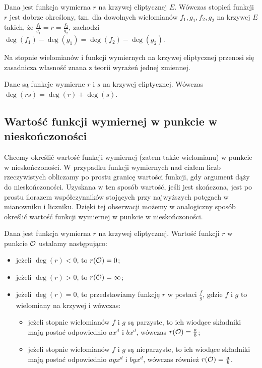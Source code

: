 \begin{theorem}
Dana jest funkcja wymierna $r$ na krzywej eliptycznej $E$.
Wówczas stopień funkcji $r$ jest dobrze określony,
tzn. dla dowolnych wielomianów $f_1, g_1, f_2, g_2$ na krzywej $E$ takich,
że $\frac{f_1}{g_1} = r = \frac{f_2}{g_2}$,
zachodzi $\deg(f_1) - \deg(g_1) = \deg(f_2) - \deg(g_2)$.
\end{theorem}

Na stopnie wielomianów i funkcji wymiernych na krzywej eliptycznej
przenosi się zasadnicza własność znana z teorii wyrażeń jednej zmiennej.

\begin{theorem}
Dane są funkcje wymierne $r$ i $s$ na krzywej eliptycznej.
Wówczas $\deg(rs) = \deg(r) + \deg(s)$.
\end{theorem}

\subsection*{Wartość funkcji wymiernej w punkcie w nieskończoności}

Chcemy określić wartość funkcji wymiernej (zatem także wielomianu)
w punkcie w nieskończoności.
W przypadku funkcji wymiernych nad ciałem liczb rzeczywistych
obliczamy po prostu granicę wartości funkcji,
gdy argument dąży do nieskończoności.
Uzyskana w ten sposób wartość, jeśli jest skończona,
jest po prostu ilorazem współczynników stojących przy najwyższych potęgach
w mianowniku i liczniku.
Dzięki tej obserwacji możemy w analogiczny sposób określić
wartość funkcji wymiernej w punkcie w nieskończoności.

\begin{definition}
Dana jest funkcja wymierna $r$ na krzywej eliptycznej.
Wartość funkcji $r$ w punkcie $\mathcal{O}$ ustalamy następująco:
\begin{itemize}
\item jeżeli $\deg(r) < 0$, to $r(\mathcal{O}) = 0$;
\item jeżeli $\deg(r) > 0$, to $r(\mathcal{O}) = \infty$;
\item jeżeli $\deg(r) = 0$,
to przedstawiamy funkcję $r$ w postaci $\frac{f}{g}$,
gdzie $f$ i $g$ to wielomiany na krzywej i wówczas:
\begin{itemize}
\item jeżeli stopnie wielomianów $f$ i $g$ są parzyste,
to ich wiodące składniki mają postać odpowiednio $ax^d$ i $bx^d$,
wówczas $r(\mathcal{O}) = \frac{a}{b}$;
\item jeżeli stopnie wielomianów $f$ i $g$ są nieparzyste,
to ich wiodące składniki mają postać odpowiednio $ayx^d$ i $byx^d$,
wówczas również $r(\mathcal{O}) = \frac{a}{b}$.
\end{itemize}
\end{itemize}
\end{definition}

